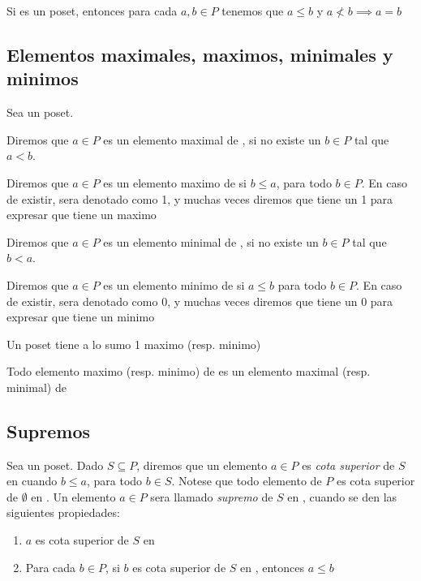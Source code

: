 \begin{remark}
  Si \poset es un poset, entonces para cada $a, b \in P$ tenemos que $a\leq b$ y $a \not< b \implies a = b$
\end{remark}
\subsection{Elementos maximales, maximos, minimales y minimos}
\begin{definition}
  Sea \poset un poset.
  
  Diremos que $a \in P$ es un elemento maximal de \poset, si no existe un $b \in P$ tal que $a < b$.

  Diremos que $a \in P$ es un elemento maximo de \poset si $b \leq a$, para todo $b \in P$.
  En caso de existir, sera denotado como 1, y muchas veces diremos que \poset tiene un 1 para expresar que \poset
  tiene un maximo

  Diremos que $a \in P$ es un elemento minimal de \poset, si no existe un $b \in P$ tal que $b < a$.
  
  Diremos que $a \in P$ es un elemento minimo de \poset si $a \leq b$ para todo $b \in P$.
  En caso de existir, sera denotado como 0, y muchas veces diremos que \poset tiene un 0 para expresar que \poset
  tiene un minimo
\end{definition}

\begin{remark}
  Un poset \poset tiene a lo sumo 1 maximo (resp. minimo)
\end{remark}
\begin{remark}
  Todo elemento maximo (resp. minimo) de \poset es un elemento maximal (resp. minimal) de \poset
\end{remark}

\subsection{Supremos}
Sea \poset un poset. Dado $S \subseteq P$, diremos que un elemento $a \in P$ es \emph{cota superior} de $S$
en \poset cuando $b \leq a$, para todo $b \in S$. Notese que todo elemento de $P$ es cota superior de $\emptyset$
en \poset. Un elemento $a \in P$ sera llamado \emph{supremo} de $S$ en \poset, cuando se den las siguientes propiedades:
\begin{enumerate}
  \item $a$ es cota superior de $S$ en \poset
  \item Para cada $b \in P$, si $b$ es cota superior de $S$ en \poset, entonces $a \leq b$
\end{enumerate}
